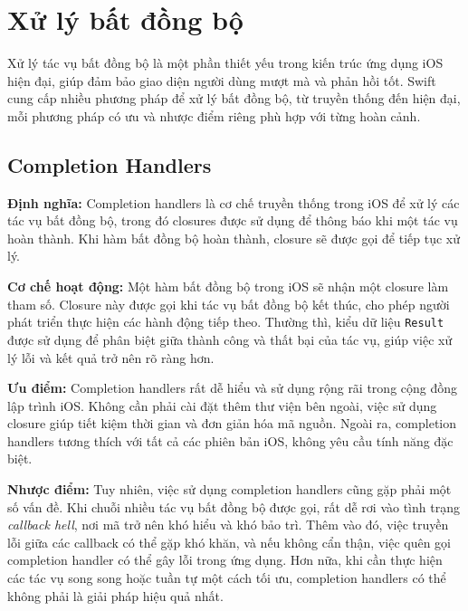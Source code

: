 \section{Xử lý bất đồng bộ}

Xử lý tác vụ bất đồng bộ là một phần thiết yếu trong kiến trúc ứng dụng iOS hiện đại, giúp đảm bảo giao diện người dùng mượt mà và phản hồi tốt. Swift cung cấp nhiều phương pháp để xử lý bất đồng bộ, từ truyền thống đến hiện đại, mỗi phương pháp có ưu và nhược điểm riêng phù hợp với từng hoàn cảnh.

\subsection{Completion Handlers}
\textbf{Định nghĩa:} Completion handlers \cite{Completion-handlers} là cơ chế truyền thống trong iOS để xử lý các tác vụ bất đồng bộ, trong đó closures được sử dụng để thông báo khi một tác vụ hoàn thành. Khi hàm bất đồng bộ hoàn thành, closure sẽ được gọi để tiếp tục xử lý.

\vspace{0.5em}

\textbf{Cơ chế hoạt động:} Một hàm bất đồng bộ trong iOS sẽ nhận một closure làm tham số. Closure này được gọi khi tác vụ bất đồng bộ kết thúc, cho phép người phát triển thực hiện các hành động tiếp theo. Thường thì, kiểu dữ liệu \texttt{Result} được sử dụng để phân biệt giữa thành công và thất bại của tác vụ, giúp việc xử lý lỗi và kết quả trở nên rõ ràng hơn.

\vspace{0.5em}

\textbf{Ưu điểm:} Completion handlers rất dễ hiểu và sử dụng rộng rãi trong cộng đồng lập trình iOS. Không cần phải cài đặt thêm thư viện bên ngoài, việc sử dụng closure giúp tiết kiệm thời gian và đơn giản hóa mã nguồn. Ngoài ra, completion handlers tương thích với tất cả các phiên bản iOS, không yêu cầu tính năng đặc biệt.

\vspace{0.5em}

\textbf{Nhược điểm:} Tuy nhiên, việc sử dụng completion handlers cũng gặp phải một số vấn đề. Khi chuỗi nhiều tác vụ bất đồng bộ được gọi, rất dễ rơi vào tình trạng \textit{callback hell}, nơi mã trở nên khó hiểu và khó bảo trì. Thêm vào đó, việc truyền lỗi giữa các callback có thể gặp khó khăn, và nếu không cẩn thận, việc quên gọi completion handler có thể gây lỗi trong ứng dụng. Hơn nữa, khi cần thực hiện các tác vụ song song hoặc tuần tự một cách tối ưu, completion handlers có thể không phải là giải pháp hiệu quả nhất.

